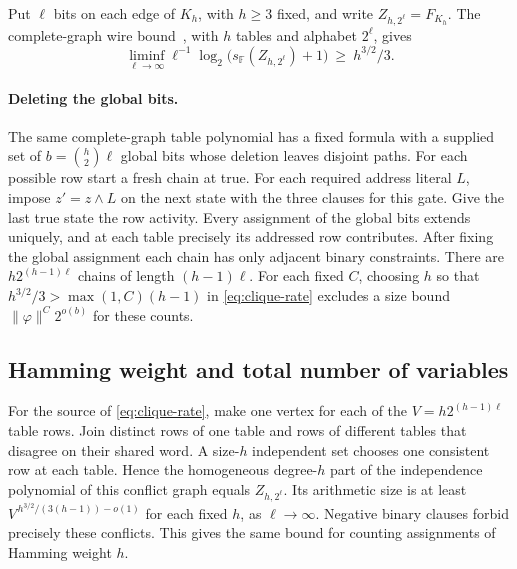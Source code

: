 \documentclass[11pt]{article}
\theoremstyle{definition}
\newcommand{\F}{\mathbb F}
\begin{document}
Put \(\ell\) bits on each edge of \(K_h\), with \(h\ge3\) fixed, and write \(Z_{h,2^\ell}=F_{K_h}\). The complete-graph wire bound~\cite{vp-vnp-prices}, with \(h\) tables and alphabet \(2^\ell\), gives
\begin{equation}\label{eq:clique-rate}
 \liminf_{\ell\to\infty}\ell^{-1}\log_2\bigl(s_\F(Z_{h,2^\ell})+1\bigr)\ \ge\ h^{3/2}/3 .
\end{equation}

\paragraph{Deleting the global bits.}
The same complete-graph table polynomial has a fixed formula with a supplied set of \(b=\binom h2\ell\) global bits whose deletion leaves disjoint paths. For each possible row start a fresh chain at true. For each required address literal \(L\), impose \(z'=z\land L\) on the next state with the three clauses for this gate. Give the last true state the row activity. Every assignment of the global bits extends uniquely, and at each table precisely its addressed row contributes. After fixing the global assignment each chain has only adjacent binary constraints. There are \(h2^{(h-1)\ell}\) chains of length \((h-1)\ell\). For each fixed \(C\), choosing \(h\) so that \(h^{3/2}/3>\max(1,C)(h-1)\) in \eqref{eq:clique-rate} excludes a size bound \(\|\varphi\|^C2^{o(b)}\) for these counts.

\subsection{Hamming weight and total number of variables}

For the source of \eqref{eq:clique-rate}, make one vertex for each of the \(V=h2^{(h-1)\ell}\) table rows. Join distinct rows of one table and rows of different tables that disagree on their shared word. A size-\(h\) independent set chooses one consistent row at each table. Hence the homogeneous degree-\(h\) part of the independence polynomial of this conflict graph equals \(Z_{h,2^\ell}\). Its arithmetic size is at least \(V^{\,h^{3/2}/(3(h-1))-o(1)}\) for each fixed \(h\), as \(\ell\to\infty\). Negative binary clauses forbid precisely these conflicts. This gives the same bound for counting assignments of Hamming weight \(h\).
\end{document}
